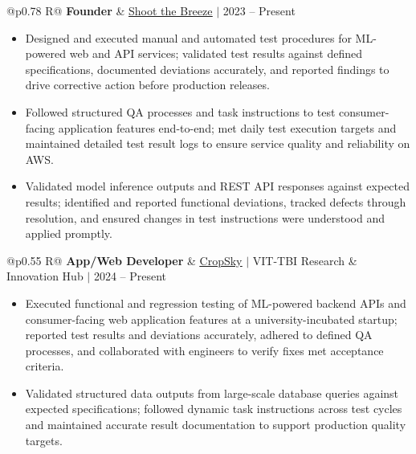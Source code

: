 \documentclass[a4paper,10pt]{article}
\newcommand{\ulink}[2]{\href{#1}{\uline{#2}}}
\newcommand{\subheading}[1]{{\color[HTML]{0A0A0A}\fontsize{12}{14}\selectfont\bfseries #1}}
\newcommand{\meta}[1]{{\color[HTML]{5C5C5C}\fontsize{10.5}{12.5}\selectfont #1}}
\begin{document}
\begin{tabularx}{\linewidth}{@{}p{0.78\linewidth} R@{}}
\subheading{Founder} & \meta{\ulink{https://shoot-the-breeze.vercel.app}{Shoot the Breeze} $|$ 2023 -- Present}
\end{tabularx}
\begin{itemize}[nosep, leftmargin=1.5em, itemsep=1pt, topsep=2pt]
\item {\color[HTML]{0A0A0A}\fontsize{11}{14}\selectfont
Designed and executed manual and automated test procedures for ML-powered web and API services; validated test results against defined specifications, documented deviations accurately, and reported findings to drive corrective action before production releases.}
\item {\color[HTML]{0A0A0A}\fontsize{11}{14}\selectfont
Followed structured QA processes and task instructions to test consumer-facing application features end-to-end; met daily test execution targets and maintained detailed test result logs to ensure service quality and reliability on AWS.}
\item {\color[HTML]{0A0A0A}\fontsize{11}{14}\selectfont
Validated model inference outputs and REST API responses against expected results; identified and reported functional deviations, tracked defects through resolution, and ensured changes in test instructions were understood and applied promptly.}
\end{itemize}

\vspace{2pt}

\begin{tabularx}{\linewidth}{@{}p{0.55\linewidth} R@{}}
\subheading{App/Web Developer} & \meta{\ulink{https://sites.google.com/view/cropsky/home}{CropSky} $|$ VIT-TBI Research \& Innovation Hub $|$ 2024 -- Present}
\end{tabularx}
\begin{itemize}[nosep, leftmargin=1.5em, itemsep=1pt, topsep=2pt]
\item {\color[HTML]{0A0A0A}\fontsize{11}{14}\selectfont
Executed functional and regression testing of ML-powered backend APIs and consumer-facing web application features at a university-incubated startup; reported test results and deviations accurately, adhered to defined QA processes, and collaborated with engineers to verify fixes met acceptance criteria.}
\item {\color[HTML]{0A0A0A}\fontsize{11}{14}\selectfont
Validated structured data outputs from large-scale database queries against expected specifications; followed dynamic task instructions across test cycles and maintained accurate result documentation to support production quality targets.}
\end{itemize}
\end{document}
